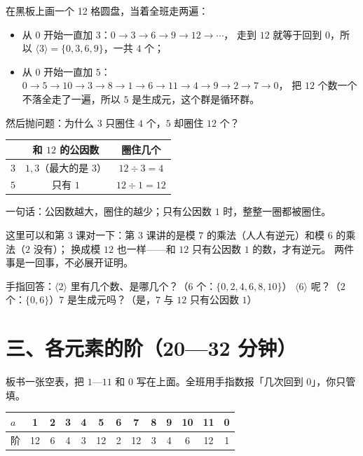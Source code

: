 \begin{caozuo}
  在黑板上画一个 12 格圆盘，当着全班走两遍：
  \begin{itemize}
    \item 从 \(0\) 开始一直加 \(3\)：\(0\to3\to6\to9\to12\to\cdots\)，
      走到 \(12\) 就等于回到 \(0\)，所以 \(\langle3\rangle=\{0,3,6,9\}\)，一共 \(4\) 个；
    \item 从 \(0\) 开始一直加 \(5\)：\(0\to5\to10\to3\to8\to1\to6\to11\to4\to9\to2\to7\to0\)，
      把 \(12\) 个数一个不落全走了一遍，所以 \(5\) 是生成元，这个群是循环群。
  \end{itemize}
\end{caozuo}

然后抛问题：为什么 \(3\) 只圈住 \(4\) 个，\(5\) 却圈住 \(12\) 个？

\begin{center}
\begin{tabular}{@{}lcc@{}}
  \toprule
   & 和 \(12\) 的公因数 & 圈住几个 \\
  \midrule
  \(3\) & \(1,3\)（最大的是 \(3\)） & \(12\div3=4\) \\
  \(5\) & 只有 \(1\) & \(12\div1=12\) \\
  \bottomrule
\end{tabular}
\end{center}

一句话：公因数越大，圈住的越少；只有公因数 \(1\) 时，整整一圈都被圈住。

\begin{zhu}
  这里可以和第 3 课对一下：第 3 课讲的是模 \(7\) 的乘法（人人有逆元）和模 \(6\) 的乘法（\(2\) 没有）；
  换成模 \(12\) 也一样——和 \(12\) 只有公因数 \(1\) 的数，才有逆元。
  两件事是一回事，不必展开证明。
\end{zhu}

\begin{caozuo}
  手指回答：\(\langle2\rangle\) 里有几个数、是哪几个？（\(6\) 个：\(\{0,2,4,6,8,10\}\)）
  \(\langle6\rangle\) 呢？（\(2\) 个：\(\{0,6\}\)）\(7\) 是生成元吗？（是，\(7\) 与 \(12\) 只有公因数 \(1\)）
\end{caozuo}

\section*{三、各元素的阶（20—32 分钟）}

板书一张空表，把 \(1\text{—}11\) 和 \(0\) 写在上面。全班用手指数报「几次回到 \(0\)」，你只管填。

\begin{center}
\begin{tabular}{@{}l*{12}{c}@{}}
  \toprule
  \(a\) & 1 & 2 & 3 & 4 & 5 & 6 & 7 & 8 & 9 & 10 & 11 & 0 \\
  \midrule
  阶 & 12 & 6 & 4 & 3 & 12 & 2 & 12 & 3 & 4 & 6 & 12 & 1 \\
  \bottomrule
\end{tabular}
\end{center}

